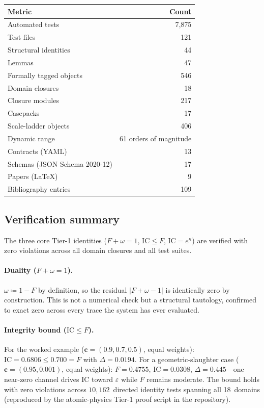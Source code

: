 \documentclass[
  aps,
  prd,
  twocolumn,
  superscriptaddress,
  nofootinbib,
  floatfix
]{revtex4-2}
\newcommand{\eps}{\varepsilon}
\newcommand{\tvec}{\mathbf{c}}
\newcommand{\IC}{\mathrm{IC}}
\begin{document}
\begin{center}
{\small\begin{tabular}{@{}lr@{}}
\toprule
\textbf{Metric} & \textbf{Count} \\
\midrule
Automated tests & 7{,}875 \\
Test files & 121 \\
Structural identities & 44 \\
Lemmas & 47 \\
Formally tagged objects & 546 \\
Domain closures & 18 \\
Closure modules & 217 \\
Casepacks & 17 \\
Scale-ladder objects & 406 \\
Dynamic range & 61 orders of magnitude \\
Contracts (YAML) & 13 \\
Schemas (JSON Schema 2020-12) & 17 \\
Papers (LaTeX) & 9 \\
Bibliography entries & 109 \\
\bottomrule
\end{tabular}}
\end{center}

\subsection{Verification summary}

The three core Tier-1 identities ($F + \omega = 1$,
$\IC \leq F$, $\IC = e^\kappa$) are verified with zero violations
across all domain closures and all test suites.

\paragraph{Duality ($F + \omega = 1$).}
$\omega \coloneqq 1 - F$ by definition, so the residual
$|F + \omega - 1|$ is identically zero by construction.
This is not a numerical check but a structural tautology,
confirmed to exact zero across every trace the system has
ever evaluated.

\paragraph{Integrity bound ($\IC \leq F$).}
For the worked example ($\tvec = (0.9, 0.7, 0.5)$,
equal weights): $\IC = 0.6806 \leq 0.700 = F$ with
$\Delta = 0.0194$.  For a geometric-slaughter case
($\tvec = (0.95, 0.001)$, equal weights): $F = 0.4755$,
$\IC = 0.0308$, $\Delta = 0.445$---one near-zero channel
drives $\IC$ toward $\eps$ while $F$ remains moderate.
The bound holds with zero violations across $10{,}162$~directed
identity tests spanning all 18~domains (reproduced by the
atomic-physics Tier-1 proof script in the repository).
\end{document}
